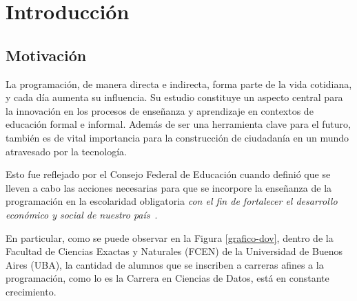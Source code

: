 \documentclass[11pt,a4paper,twoside,openany]{tesis}
\begin{document}

\def\autor{Carla de Erausquin}
\def\tituloTesis{Caracterización de trayectorias educativas a partir de producciones de código}
\def\runtitulo{Caracterización de trayectorias educativas a partir de producciones de código}
\def\runtitulo{Characterization of educational trajectories based on Code Productions}
\def\director{Matías López y Rosenfeld}
\def\codirector{Pablo Turjanski}
\def\lugar{Buenos Aires, 2024}


\frontmatter
\pagestyle{empty}


\cleardoublepage

\cleardoublepage

\cleardoublepage

\cleardoublepage
\tableofcontents

\mainmatter
\pagestyle{headings}



\chapter{Introducción}
\section{Motivación}

La programación, de manera directa e indirecta, forma parte de la vida cotidiana, y cada día aumenta su influencia. Su estudio constituye un aspecto central para la innovación en los procesos de enseñanza y aprendizaje en contextos de educación formal e informal. Además de ser una herramienta clave para el futuro, también es de vital importancia para la construcción de ciudadanía en un mundo atravesado por la tecnología. 

Esto fue reflejado por el Consejo Federal de Educación cuando definió que se lleven a cabo las acciones necesarias para que se incorpore la enseñanza de la programación en la escolaridad obligatoria \emph{con el fin de fortalecer el desarrollo económico y social de nuestro país}~\cite{resolucionProgramar}.

En particular, como se puede observar en la Figura \ref{grafico-dov}, dentro de la Facultad de Ciencias Exactas y Naturales (FCEN) de la Universidad de Buenos Aires (UBA), la cantidad de alumnos que se inscriben a carreras afines a la programación, como lo es la Carrera en Ciencias de Datos, está en constante crecimiento.
\end{document}
